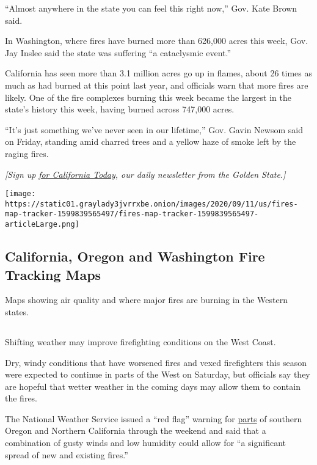 ``Almost anywhere in the state you can feel this right now,'' Gov. Kate
Brown said.

In Washington, where fires have burned more than 626,000 acres this
week, Gov. Jay Inslee said the state was suffering ``a cataclysmic
event.''

California has seen more than 3.1 million acres go up in flames, about
26 times as much as had burned at this point last year, and officials
warn that more fires are likely. One of the fire complexes burning this
week became the largest in the state's history this week, having burned
across 747,000 acres.

``It's just something we've never seen in our lifetime,'' Gov. Gavin
Newsom said on Friday, standing amid charred trees and a yellow haze of
smoke left by the raging fires.

\emph{{[}Sign up}
\href{https://www.nytimes3xbfgragh.onion/newsletters/california-today}{\emph{for
California Today}}\emph{, our daily newsletter from the Golden
State.{]}}

\href{https://www.nytimes3xbfgragh.onion/interactive/2020/us/fires-map-tracker.html}{}

\texttt{[image: https://static01.graylady3jvrrxbe.onion/images/2020/09/11/us/fires-map-tracker-1599839565497/fires-map-tracker-1599839565497-articleLarge.png]}

\hypertarget{california-oregon-and-washington-fire-tracking-maps}{%
\subsection{California, Oregon and Washington Fire Tracking
Maps}\label{california-oregon-and-washington-fire-tracking-maps}}

Maps showing air quality and where major fires are burning in the
Western states.

\hypertarget{-1}{%
\subsection{}\label{-1}}

Shifting weather may improve firefighting conditions on the West Coast.

Dry, windy conditions that have worsened fires and vexed firefighters
this season were expected to continue in parts of the West on Saturday,
but officials say they are hopeful that wetter weather in the coming
days may allow them to contain the fires.

The National Weather Service issued a ``red flag'' warning for
\href{https://www.wrh.noaa.gov/map/?\&zoom=7\&scroll_zoom=true\&center=42.28950073090457,-123.72802734375\&basemap=OpenStreetMap\&boundaries=true,true\&hazard=true\&hazard_type=hi-all\&hazard_opacity=60}{parts}
of southern Oregon and Northern California through the weekend and said
that a combination of gusty winds and low humidity could allow for ``a
significant spread of new and existing fires.''

